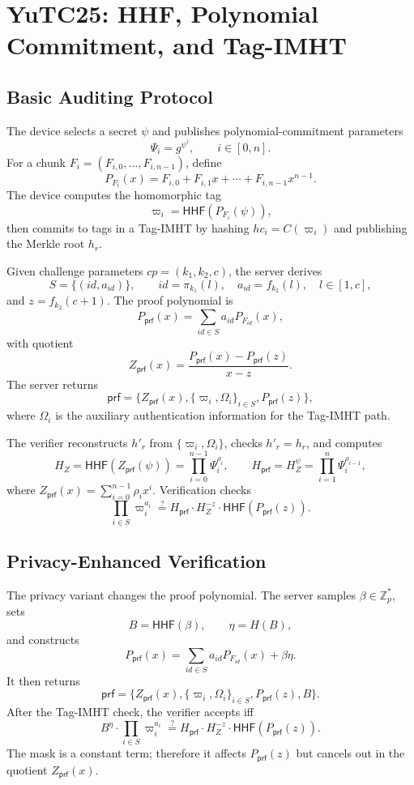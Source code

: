 \documentclass[11pt]{article}
\newcommand{\Zp}{\mathbb{Z}_p}
\begin{document}
\section{YuTC25: HHF, Polynomial Commitment, and Tag-IMHT}

\subsection{Basic Auditing Protocol}

The device selects a secret \(\psi\) and publishes polynomial-commitment
parameters
\[
    \Psi_i=g^{\psi^i},\qquad i\in[0,n].
\]
For a chunk \(F_i=(F_{i,0},\ldots,F_{i,n-1})\), define
\[
    P_{F_i}(x)=F_{i,0}+F_{i,1}x+\cdots+F_{i,n-1}x^{n-1}.
\]
The device computes the homomorphic tag
\[
    \varpi_i=\mathsf{HHF}(P_{F_i}(\psi)),
\]
then commits to tags in a Tag-IMHT by hashing \(hc_i=C(\varpi_i)\) and
publishing the Merkle root \(h_r\).

Given challenge parameters \(cp=(k_1,k_2,c)\), the server derives
\[
    S=\{(id,a_{id})\},\qquad id=\pi_{k_1}(l),\quad a_{id}=f_{k_2}(l),
    \quad l\in[1,c],
\]
and \(z=f_{k_2}(c+1)\).  The proof polynomial is
\[
    P_{\mathsf{prf}}(x)=
    \sum_{id\in S} a_{id}P_{F_{id}}(x),
\]
with quotient
\[
    Z_{\mathsf{prf}}(x)=
    \frac{P_{\mathsf{prf}}(x)-P_{\mathsf{prf}}(z)}{x-z}.
\]
The server returns
\[
    \mathsf{prf}=\{Z_{\mathsf{prf}}(x),\{\varpi_i,\Omega_i\}_{i\in S},
    P_{\mathsf{prf}}(z)\},
\]
where \(\Omega_i\) is the auxiliary authentication information for the
Tag-IMHT path.

The verifier reconstructs \(h'_r\) from \(\{\varpi_i,\Omega_i\}\), checks
\(h'_r=h_r\), and computes
\[
    H_Z=\mathsf{HHF}(Z_{\mathsf{prf}}(\psi))
    =\prod_{i=0}^{n-1}\Psi_i^{\rho_i},
    \qquad
    H_{\mathsf{prf}}=H_Z^\psi
    =\prod_{i=1}^{n}\Psi_i^{\rho_{i-1}},
\]
where \(Z_{\mathsf{prf}}(x)=\sum_{i=0}^{n-1}\rho_i x^i\).  Verification checks
\[
    \prod_{i\in S}\varpi_i^{a_i}
    \stackrel{?}{=}
    H_{\mathsf{prf}}\cdot H_Z^{-z}\cdot
    \mathsf{HHF}(P_{\mathsf{prf}}(z)).
\]

\subsection{Privacy-Enhanced Verification}

The privacy variant changes the proof polynomial.  The server samples
\(\beta\in\Zp^\ast\), sets
\[
    B=\mathsf{HHF}(\beta),\qquad \eta=H(B),
\]
and constructs
\[
    P_{\mathsf{prf}}(x)=
    \sum_{id\in S}a_{id}P_{F_{id}}(x)+\beta\eta.
\]
It then returns
\[
    \mathsf{prf}=
    \{Z_{\mathsf{prf}}(x),\{\varpi_i,\Omega_i\}_{i\in S},
    P_{\mathsf{prf}}(z),B\}.
\]
After the Tag-IMHT check, the verifier accepts iff
\[
    B^\eta\cdot\prod_{i\in S}\varpi_i^{a_i}
    \stackrel{?}{=}
    H_{\mathsf{prf}}\cdot H_Z^{-z}\cdot
    \mathsf{HHF}(P_{\mathsf{prf}}(z)).
\]
The mask is a constant term; therefore it affects \(P_{\mathsf{prf}}(z)\) but
cancels out in the quotient \(Z_{\mathsf{prf}}(x)\).
\end{document}
